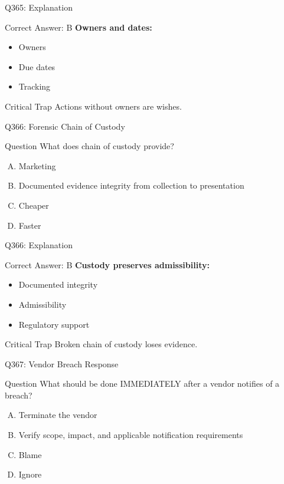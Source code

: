 \documentclass{beamer}
\begin{document}
	\begin{frame}{Q365: Explanation}
		\begin{block}{Correct Answer: B}
			\textbf{Owners and dates:}
			\begin{itemize}
				\item Owners
				\item Due dates
				\item Tracking
			\end{itemize}
		\end{block}
		\begin{alertblock}{Critical Trap}
			Actions without owners are wishes.
		\end{alertblock}
	\end{frame}
	
	\begin{frame}{Q366: Forensic Chain of Custody}
		\begin{block}{Question}
			What does chain of custody provide?
		\end{block}
		\begin{enumerate}[(A)]
			\item Marketing
			\item Documented evidence integrity from collection to presentation
			\item Cheaper
			\item Faster
		\end{enumerate}
	\end{frame}
	
	\begin{frame}{Q366: Explanation}
		\begin{block}{Correct Answer: B}
			\textbf{Custody preserves admissibility:}
			\begin{itemize}
				\item Documented integrity
				\item Admissibility
				\item Regulatory support
			\end{itemize}
		\end{block}
		\begin{alertblock}{Critical Trap}
			Broken chain of custody loses evidence.
		\end{alertblock}
	\end{frame}
	
	\begin{frame}{Q367: Vendor Breach Response}
		\begin{block}{Question}
			What should be done IMMEDIATELY after a vendor notifies of a breach?
		\end{block}
		\begin{enumerate}[(A)]
			\item Terminate the vendor
			\item Verify scope, impact, and applicable notification requirements
			\item Blame
			\item Ignore
		\end{enumerate}
	\end{frame}
	
\end{document}
